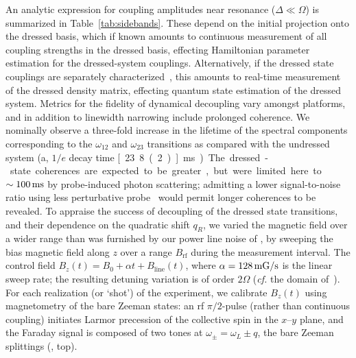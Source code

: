 \documentclass[aps,prl,reprint,superscriptaddress,floatfix]{revtex4-1}
\begin{document}
An analytic expression for coupling amplitudes near resonance ($\Delta\ll\Omega$) is summarized in Table~\ref{tab:sidebands}.
These depend on the initial projection onto the dressed basis, which if known amounts to continuous measurement of all coupling strengths in the dressed basis, effecting Hamiltonian parameter estimation for the dressed-system couplings.
Alternatively, if the dressed state couplings are separately characterized~\cite{dimitris_synthetic_2017}, this amounts to real-time measurement of the dressed density matrix, effecting quantum state estimation of the dressed system.
Metrics for the fidelity of dynamical decoupling vary amongst platforms, and in addition to linewidth narrowing include prolonged coherence.
We nominally observe a three-fold increase in the lifetime of the spectral components corresponding to the $\omega_{12}$ and $\omega_{23}$ transitions as compared with the undressed system (a, $1/e$ decay time \unit[23.8(2)]{ms}).
The dressed-state coherences are expected to be greater, but were limited here to $\sim\unit[100]{ms}$ by probe-induced photon scattering; admitting a lower signal-to-noise ratio using less perturbative probe~\cite{jasperse_magic-wavelength_2017} would permit longer coherences to be revealed.
To appraise the success of decoupling of the dressed state transitions, and their dependence on the quadratic shift $q_R$, we varied the magnetic field over a wider range than was furnished by our power line noise of , by sweeping the bias magnetic field along $z$ over a range $B_{\text{rf}}$ during the measurement interval.
The control field $B_z(t) = B_0 + \alpha t + B_{\text{line}}(t)$, where $\alpha = \unit[128]{mG/s}$ is the linear sweep rate; the resulting detuning variation is of order $2\Omega$ (\textit{cf.} the domain of~).
For each realization (or `shot') of the experiment, we calibrate $B_z(t)$ using magnetometry of the bare Zeeman states: an rf $\pi/2$-pulse (rather than continuous coupling) initiates Larmor precession of the collective spin in the $x$--$y$ plane, and the Faraday signal is composed of two tones at $\omega_\pm = \omega_L \pm q$, the bare Zeeman splittings (, top).
\end{document}
